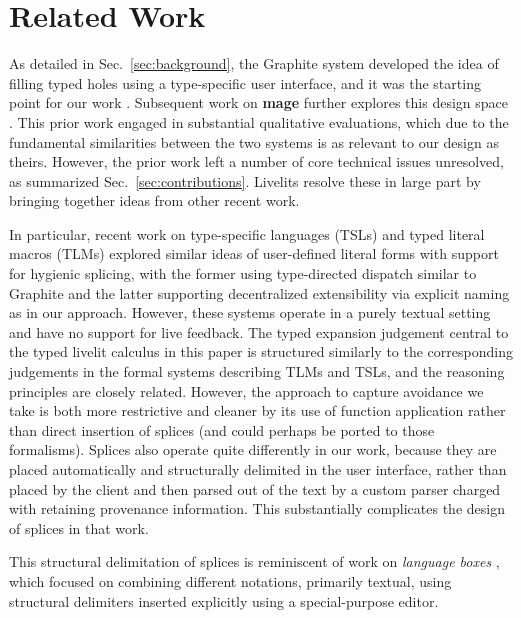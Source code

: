 \section{Related Work}\label{sec:related-work}
As detailed in Sec.~\ref{sec:background},
the Graphite system developed the idea of filling 
typed holes using a type-specific user interface, and it was the starting 
point for our work \cite{Graphite}.
Subsequent work on \textbf{mage} further explores this design space \cite{DBLP:conf/uist/KeryRHMWP20}.
This prior work engaged in substantial qualitative evaluations, 
which due to the fundamental similarities between the two systems 
is as relevant to our design as theirs. However, the prior work 
left a number of core technical issues unresolved,
as summarized Sec.~\ref{sec:contributions}.
Livelits resolve these in large part by bringing together  ideas from other recent work.

In particular, recent work on type-specific languages (TSLs) \cite{TSLs} 
and typed literal macros (TLMs) \cite{TLMs}
explored similar ideas of user-defined
literal forms with support for hygienic splicing, with the former 
using type-directed dispatch similar to Graphite and the latter supporting 
decentralized extensibility via explicit naming as in our approach. 
However, these systems operate in a purely 
textual setting and have no support for live feedback.
The typed expansion judgement central to the typed livelit calculus in this paper 
is structured similarly 
to the corresponding judgements in the formal systems describing TLMs and TSLs,
and the reasoning principles are closely related. However, the  
approach to capture avoidance we take is both more restrictive and cleaner by its use of function application 
rather than direct insertion of splices (and could perhaps be ported to those formalisms).
Splices also operate quite differently in our work,
because they are placed automatically and structurally delimited in the user interface, rather than 
placed by the client and then parsed out of the text by a custom parser charged 
with retaining provenance information.
This substantially complicates the design of splices in that work.


This structural delimitation of splices is reminiscent of work on 
\emph{language boxes} \cite{DBLP:conf/sle/RenggliDN09}, which focused on 
combining different notations, primarily textual, using structural delimiters inserted 
explicitly using a special-purpose editor. 


